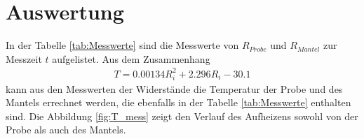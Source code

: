 \FloatBarrier
\section{Auswertung}
\label{sec:Auswertung}

In der Tabelle \ref{tab:Messwerte} sind die Messwerte von
$R_{Probe}$ und $R_{Mantel}$ zur Messzeit $t$ aufgelistet.
Aus dem Zusammenhang
\begin{align}
  T=\num{0.00134} R_i^2 + \num{2.296} R_i - \num{30.1} \label{eqn:inKelvin}
\end{align}
kann aus den Messwerten der Widerstände
die Temperatur der Probe und
des Mantels errechnet werden, die ebenfalls in der
Tabelle \ref{tab:Messwerte} enthalten sind.
Die Abbildung \ref{fig:T_mess} zeigt den
Verlauf des Aufheizens sowohl von der Probe
als auch des Mantels.



